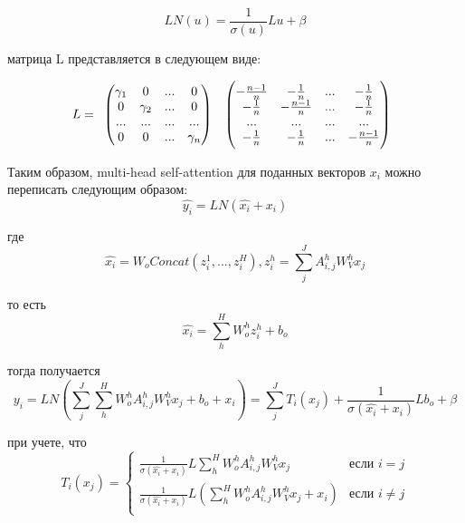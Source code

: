 \begin{equation*}
    LN(u) = \frac{1}{\sigma(u)}Lu + \beta
\end{equation*}

 матрица L представляется в следующем виде:

\[
L = \begin{array}{c c}
\begin{pmatrix}
\gamma_1 & 0 & ... & 0 \\
0 & \gamma_2 & ... & 0 \\
... & ... & ... & ... \\
0 & 0 & ... & \gamma_n \\
\end{pmatrix}
&
\begin{pmatrix}
-\frac{n - 1}{n} & -\frac{1}{n} & ... & -\frac{1}{n} \\
-\frac{1}{n} & -\frac{n - 1}{n} & ... & -\frac{1}{n} \\
... & ... & ... & ... \\
-\frac{1}{n} & -\frac{1}{n} & ... & -\frac{n - 1}{n} \\
\end{pmatrix}
\end{array}
\]

Таким образом, multi-head self-attention для поданных векторов $x_i$ можно переписать следующим образом:
\begin{equation*}
    \widehat{y_i} = LN(\widehat{x_i} + x_i)
\end{equation*}

где
\begin{equation*}
    \widehat{x_i} = W_oConcat(z^1_i, ..., z^H_i), z^h_i = \sum_{j}^{J}A^h_{i,j}W^h_{V}x_j
\end{equation*}

то есть
\begin{equation*}
    \widehat{x_i} = \sum_{h}^{H}W^h_oz^h_i + b_o
\end{equation*}

тогда получается
\begin{equation*}
    y_i = LN(\sum_{j}^{J}\sum_{h}^{H}W^h_oA^h_{i,j}W^h_Vx_j + b_o + x_i) = \sum_{j}^{J}T_i(x_j) + \frac{1}{\sigma(\widehat{x_i} + x_i)}Lb_o + \beta
\end{equation*}

при учете, что
\[
T_i(x_j) =
\begin{cases}
    \frac{1}{\sigma(\widehat{x_i} + x_i)}L\sum_{h}^{H}W^h_oA^h_{i,j}W^h_Vx_j & \text{если } i = j \\
    \frac{1}{\sigma(\widehat{x_i} + x_i)}L(\sum_{h}^{H}W^h_oA^h_{i,j}W^h_Vx_j + x_i)   & \text{если } i \neq j \\
\end{cases}
\]

